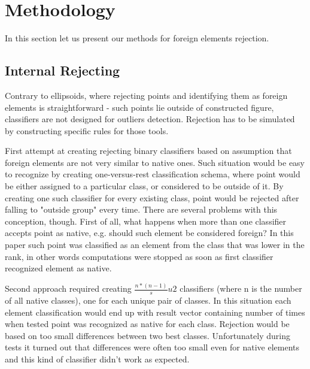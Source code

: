 \documentclass{llncs}
\begin{document}
\section{Methodology}
  \label{sec:Methodology}

{\color{blue}In this section let us present our methods for foreign elements rejection.}

\subsection{Internal Rejecting}
  \label{subsec:InternalRejecting}

Contrary to ellipsoids, where rejecting points and identifying them as foreign elements is straightforward - such points lie outside of constructed figure, classifiers are not designed for outliers detection. Rejection has to be simulated by constructing specific rules for those tools.

First attempt at creating rejecting binary classifiers based on assumption that foreign elements are not very similar to native ones. Such situation would be easy to recognize by creating one-versus-rest classification schema, where point would be either assigned to a particular class, or considered to be outside of it. By creating one such classifier for every existing class, point would be rejected after falling to "outside group" every time. There are several problems with this conception, though. First of all, what happens when more than one classifier accepts point as native, e.g. should such element be considered foreign? In this paper such point was classified as an element from the class that was lower in the rank, in other words computations were stopped as soon as first classifier recognized element as native.

Second approach required creating $\frac{n * (n-1)}su{2}$ classifiers (where n is the number of all native classes), one for each unique pair of classes. In this situation each element classification would end up with result vector containing number of times when tested point was recognized as native for each class. Rejection would be based on too small differences between two best classes. Unfortunately during tests it turned out that differences were often too small even for native elements and this kind of classifier didn't work as expected.
\end{document}
